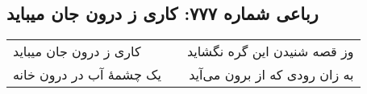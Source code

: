 \begin{center}
\section*{رباعی شماره ۷۷۷: کاری ز درون جان میباید}
\label{sec:0777}
\begin{longtable}{l p{0.5cm} r}
کاری ز درون جان میباید
&&
وز قصه شنیدن این گره نگشاید
\\
یک چشمهٔ آب در درون خانه
&&
به زان رودی که از برون می‌آید
\\
\end{longtable}
\end{center}
